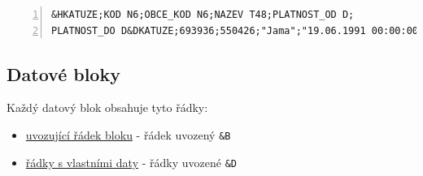 \begin{description}
\begin{lstlisting}[basicstyle=\footnotesize\ttfamily, backgroundcolor = \color{light-gray},  numbers=left]
&HKATUZE;KOD N6;OBCE_KOD N6;NAZEV T48;PLATNOST_OD D;
PLATNOST_DO D&DKATUZE;693936;550426;"Jama";"19.06.1991 00:00:00";""
 \end{lstlisting}

\end{description}

\subsection{Datové bloky}
\label{datove_bloky}

Každý datový blok obsahuje tyto řádky:
	\begin{itemize}[leftmargin=1.5cm, noitemsep]
		\item \underline{uvozující řádek bloku} - řádek uvozený \texttt{\&B}
		\item \underline{řádky s vlastními daty} - řádky uvozené \texttt{\&D}
	\end{itemize}

